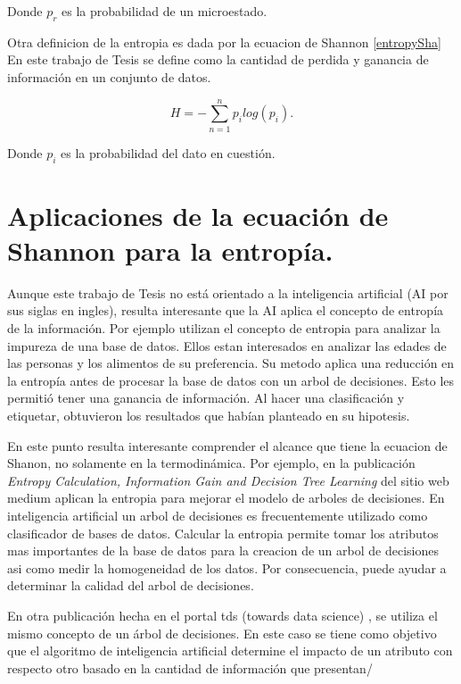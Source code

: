 Donde $p_r$ es la probabilidad de un microestado. 

Otra definicion de la entropia es dada por la ecuacion de Shannon \ref{entropySha}
En este trabajo de Tesis se define como la cantidad de perdida y ganancia de información en un conjunto de datos.

\begin{equation}
	H = - \sum_{n=1}^{n} p_i log(p_i).
	\label{entropySha}
\end{equation}

Donde $p_i$ es la probabilidad del dato en cuestión. 

\section{Aplicaciones de la ecuación de Shannon para la entropía.}

Aunque este trabajo de Tesis no está orientado a la inteligencia artificial (AI por sus siglas en ingles), resulta interesante que la AI aplica el concepto de entropía de la información. 
Por ejemplo \citep{dos2012entropy} utilizan el concepto de entropia para analizar la impureza de una base de datos. 
Ellos estan interesados en analizar las edades de las personas y los alimentos de su preferencia. 
Su metodo aplica una reducción en la entropía antes de procesar la base de datos con un arbol de decisiones. 
Esto les permitió tener una ganancia de información\citep[][]{dos2012entropy}. 
Al hacer una clasificación y etiquetar, obtuvieron los resultados que habían planteado en su hipotesis.

En este punto resulta interesante comprender el alcance que tiene la ecuacion de Shanon, no solamente en la termodinámica. 
Por ejemplo, en la publicación \textit{Entropy Calculation, Information Gain and Decision Tree Learning} del sitio web medium \citep[][]{medium} aplican la entropia para mejorar el modelo de arboles de decisiones.
En inteligencia artificial un arbol de decisiones es frecuentemente utilizado como clasificador de bases de datos.
Calcular la entropia permite tomar los atributos mas importantes de la base de datos para la creacion de un arbol de decisiones asi como medir la homogeneidad de los datos. 
Por consecuencia, puede ayudar a determinar la calidad del arbol de decisiones. 

En otra publicación hecha en el portal tds (towards data science) \citep[][]{tds}, se utiliza el mismo concepto de un árbol de decisiones.
En este caso se tiene como objetivo que el algoritmo de inteligencia artificial determine el impacto de un atributo con respecto otro basado en la cantidad de información que presentan/


